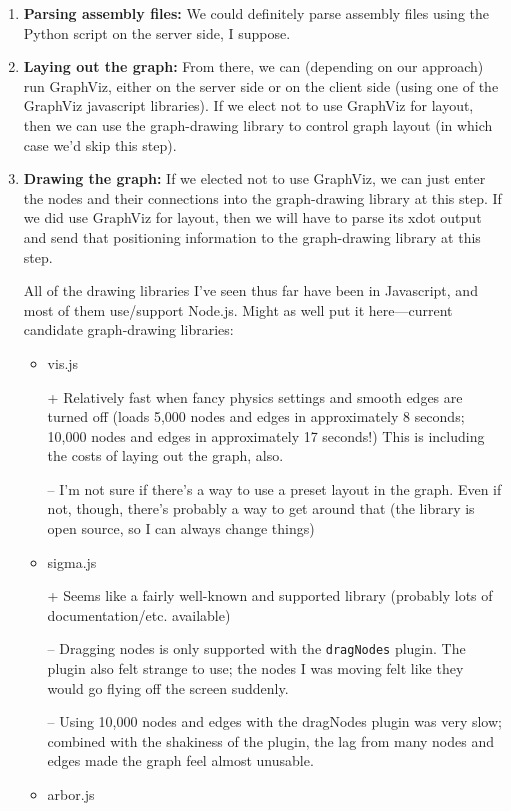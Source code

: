 \documentclass[12pt]{article}
\begin{document}
\begin{enumerate}

	\item \textbf{Parsing assembly files:} We could definitely parse assembly files using the Python script on
	the server side, I suppose.

\item \textbf{Laying out the graph:} From there, we can (depending on our approach) run GraphViz, either
	on the server side or on the client side (using one of the
	GraphViz javascript libraries). If we elect not to use GraphViz for
	layout, then we can use the graph-drawing library to control graph
		layout (in which case we'd skip this step).

\item \textbf{Drawing the graph:} 
	If we elected not to use GraphViz, we can just
	enter the nodes and their connections into the graph-drawing
	library at this step. If we did use GraphViz for layout, then
	we will have to parse its xdot output and send that positioning
	information to the graph-drawing library at this step.
	
	All of the drawing libraries
	I've seen thus far have been in Javascript, and most of them
	use/support Node.js.
	Might as well put it here---current candidate graph-drawing libraries:
	\begin{itemize}
		\item vis.js

			+ Relatively fast when fancy physics settings
			and smooth edges are turned off (loads 5,000 nodes
			and edges in approximately 8 seconds; 10,000 nodes
			and edges in approximately 17 seconds!) This is
			including the costs of laying out the graph, also.

			-- I'm not sure if there's a way to use a preset
			layout in the graph. Even if not, though, there's
			probably a way to get around that (the library
			is open source, so I can always change things)
		\item sigma.js

			+ Seems like a fairly well-known and supported
			library (probably lots of documentation/etc.
			available)

			-- Dragging nodes is only supported with the
			\texttt{dragNodes} plugin. The plugin also felt
			strange to use; the nodes I was moving felt
			like they would go flying off the screen suddenly.
			
			-- Using 10,000 nodes and edges with the dragNodes
			plugin was very slow; combined with the shakiness
			of the plugin, the lag from many nodes and edges
			made the graph feel almost unusable.
		\item arbor.js


\end{itemize}
\end{enumerate}
\end{document}

